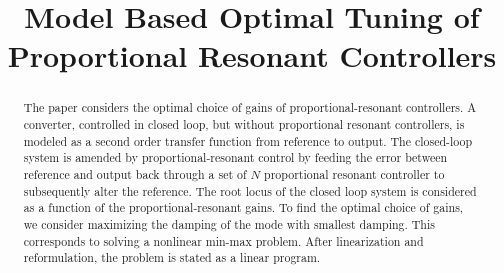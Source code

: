 \documentclass[conference,10pt]{IEEEtran}
\begin{document}
%


\title{Model Based Optimal Tuning of Proportional Resonant Controllers}



\author{
\IEEEauthorblockA{  }
\IEEEauthorblockE{}}


%



\maketitle


\begin{abstract}
The paper considers the optimal choice of gains of proportional-resonant controllers. A converter, controlled in closed loop, but without proportional resonant controllers, is modeled as a second order transfer function from reference to output. The closed-loop system is amended by proportional-resonant control by feeding the error between reference and output back through a set of $N$ proportional resonant controller to subsequently alter the reference. The root locus of the closed loop system is considered as a function of the proportional-resonant gains. To find the optimal choice of gains, we consider maximizing the damping of the mode with smallest damping. This corresponds to solving a nonlinear min-max problem. After linearization and reformulation, the problem is stated as a linear program.
\end{abstract}
\end{document}
